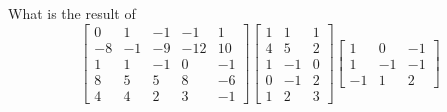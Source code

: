 \bexo
What is the result of 
\begin{equation*}
\left[
\begin{array}{ccccc}
0  &   1  &  -1  &  -1  &   1\\
-8  &  -1  &  -9  & -12  &  10\\
1  &   1  &  -1  &   0  &  -1\\
8  &   5  &   5  &   8  &  -6\\
4  &   4  &   2  &   3  &  -1
\end{array}
\right]
\left[
\begin{array}{ccc}
1  &   1  &   1\\
4  &   5  &   2\\
1  &  -1  &   0\\
0  &  -1  &   2\\
1  &   2  &   3
\end{array}
\right]
\left[
\begin{array}{ccc}
1  &   0  &  -1\\
1  &  -1  &  -1\\
-1  &   1  &   2
\end{array}
\right]
\end{equation*}
\eexo
{}

